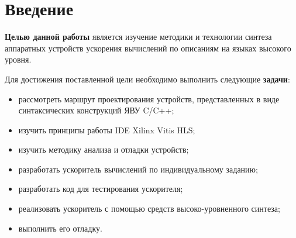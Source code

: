 \chapter*{Введение}

\textbf{Целью данной работы} является изучение методики и технологии синтеза
аппаратных устройств ускорения вычислений по описаниям на языках высокого
уровня. 

Для достижения поставленной цели необходимо выполнить следующие
\textbf{задачи}:
\begin{itemize}
    \item рассмотреть маршрут проектирования устройств, представленных в виде
          синтаксических конструкций ЯВУ C/C++;
    \item изучить принципы работы IDE Xilinx Vitis HLS;
    \item изучить методику анализа и отладки устройств;
    \item разработать ускоритель вычислений по индивидуальному заданию;
    \item разработать код для тестирования ускорителя;
    \item реализовать ускоритель с помощью средств высоко-уровненного синтеза;
    \item выполнить его отладку.
\end{itemize}
